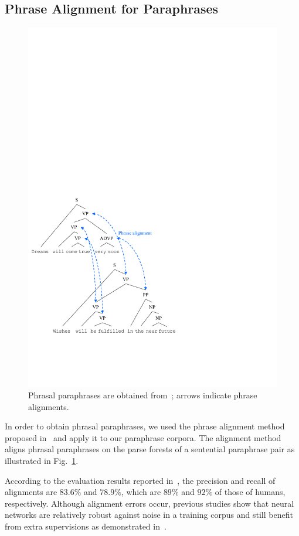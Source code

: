 \documentclass[11pt,a4paper]{article}
\newcommand{\Fref}[1]{Fig.~\ref{#1}}
\begin{document}
\subsection{Phrase Alignment for Paraphrases}
\label{sec:phrase_alignment}
\begin{figure}[!t]
\centering
\includegraphics[width=0.9\linewidth]{fig/phrase_alignment.pdf}
\caption{Phrasal paraphrases are obtained from~\cite{arase:emnlp2017}; arrows indicate phrase alignments.}
\label{fig:phrase_alignment}
\end{figure} 
In order to obtain phrasal paraphrases, we used the phrase alignment method proposed in~\cite{arase:emnlp2017} and apply it to our paraphrase corpora. 
The alignment method aligns phrasal paraphrases on the parse forests of a sentential paraphrase pair as illustrated in \Fref{fig:phrase_alignment}. 


According to the evaluation results reported in~\cite{arase:emnlp2017}, the precision and recall of alignments are $83.6\%$ and $78.9\%$, which are $89\%$ and $92\%$ of those of humans, respectively. 
Although alignment errors occur, previous studies show that neural networks are relatively robust against noise in a training corpus and still benefit from extra supervisions as demonstrated in~\cite{D18-1045,P18-1080}. 
\end{document}
